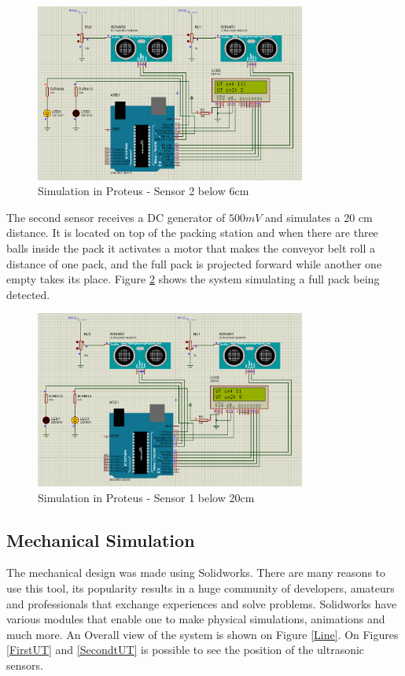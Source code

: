 \documentclass[transmag]{IEEEtran}
\begin{document}
\begin{figure}[h]
\centerline{\includegraphics[width=3.5in]{./images/Proteus1}}
\caption{Simulation in Proteus - Sensor 2 below 6cm\label{Proteus1}}
\end{figure}

The second sensor receives a DC generator of $500 mV$ and simulates a 20 cm distance. It is located on top of the packing station and when there are three balls inside the pack it activates a motor that makes the conveyor belt roll a distance of one pack, and the full pack is projected forward while another one empty takes its place. Figure \ref{Proteus2} shows the system simulating a full pack being detected.

\begin{figure}[h]
\centerline{\includegraphics[width=3.5in]{./images/Proteus2}}
\caption{Simulation in Proteus - Sensor 1 below 20cm\label{Proteus2}}
\end{figure}


\subsection{Mechanical Simulation}

The mechanical design was made using Solidworks. There are many reasons to use this tool, its popularity results in a huge community of developers, amateurs and professionals that exchange experiences and solve problems. Solidworks have various modules that enable one to make physical simulations, animations and much more. An Overall view of the system is shown on Figure \ref{Line}.
On Figures \ref{FirstUT} and \ref{SecondtUT} is possible to see the position of the ultrasonic sensors.
\end{document}
